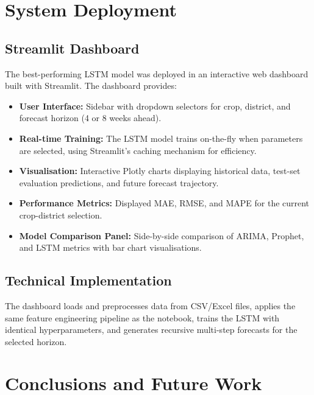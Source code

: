 \documentclass[12pt,a4paper]{article}
\begin{document}
\section{System Deployment}

\subsection{Streamlit Dashboard}
The best-performing LSTM model was deployed in an interactive web dashboard built with Streamlit. The dashboard provides:

\begin{itemize}
    \item \textbf{User Interface:} Sidebar with dropdown selectors for crop, district, and forecast horizon (4 or 8 weeks ahead).
    \item \textbf{Real-time Training:} The LSTM model trains on-the-fly when parameters are selected, using Streamlit's caching mechanism for efficiency.
    \item \textbf{Visualisation:} Interactive Plotly charts displaying historical data, test-set evaluation predictions, and future forecast trajectory.
    \item \textbf{Performance Metrics:} Displayed MAE, RMSE, and MAPE for the current crop-district selection.
    \item \textbf{Model Comparison Panel:} Side-by-side comparison of ARIMA, Prophet, and LSTM metrics with bar chart visualisations.
\end{itemize}

\subsection{Technical Implementation}
The dashboard loads and preprocesses data from CSV/Excel files, applies the same feature engineering pipeline as the notebook, trains the LSTM with identical hyperparameters, and generates recursive multi-step forecasts for the selected horizon.

\section{Conclusions and Future Work}
\end{document}
